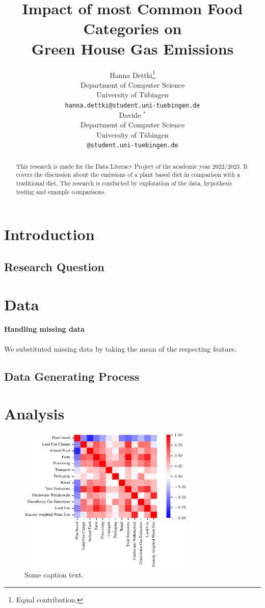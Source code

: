 \documentclass{article}
\title{Impact of most Common Food Categories on\\ Green House Gas Emissions}
\author{%
  Hanna Dettki\thanks{Equal contribution.} \\
  Department of Computer Science\\
  University of Tübingen\\
  \texttt{hanna.dettki@student.uni-tuebingen.de} \\
  \And
  Davide $^{*}$  \\
  Department of Computer Science\\
  University of Tübingen\\
  \texttt{@student.uni-tuebingen.de} \\
}
\begin{document}
\maketitle

\begin{abstract}
  This research is made for the Data Literacy Project of the academic year 2022/2023. It covers the discussion about the emissions of a plant based diet in comparison with a traditional diet. The research is conducted by exploration of the data, hypothesis testing and example comparisons. 
\end{abstract}

\section{Introduction}




\subsection{Research Question}



\section{Data}
\label{data}

\paragraph{Handling missing data}
We substituted  missing  data by taking the mean of the respecting feature. 
\subsection{Data Generating Process}
\label{dataGen}



\section{Analysis}
\label{analysis}


\begin{figure}[h]
  \centering
  \includegraphics[width=0.75\textwidth]{figures/heat-map.pdf}
  \caption{Some caption text.}
\end{figure}
\end{document}
